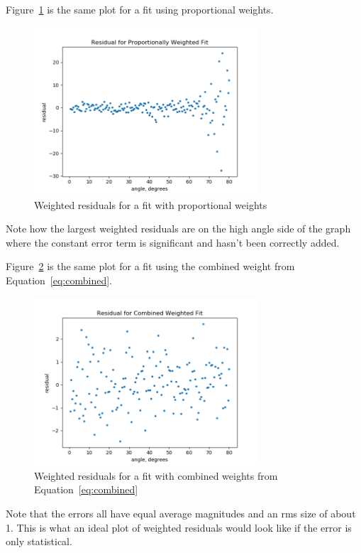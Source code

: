 \documentclass[english]{scrartcl}
\begin{document}
Figure~\ref{fig:res-propweight} is the same plot for a fit
using proportional weights.
\begin{figure}[htb]
  \begin{center}
    \includegraphics[width=0.75\textwidth]{images/res-propweight}
  \end{center}
  \caption{\label{fig:res-propweight}Weighted residuals
  for a fit with proportional weights}
\end{figure}
Note how the largest weighted residuals are on the high
angle side of the graph where the constant error term
is significant and hasn't been correctly added.

Figure~\ref{fig:res-combweight} is the same plot for a fit
using the combined weight from Equation~\ref{eq:combined}.
\begin{figure}[htb]
  \begin{center}
    \includegraphics[width=0.75\textwidth]{images/res-combweight}
  \end{center}
  \caption{\label{fig:res-combweight}Weighted residuals
  for a fit with combined weights from Equation~\ref{eq:combined}}
\end{figure}
Note that the errors all have equal average
magnitudes and an
rms size of about 1. This is what an ideal plot of weighted
residuals would look like if the error is only statistical.
\end{document}
